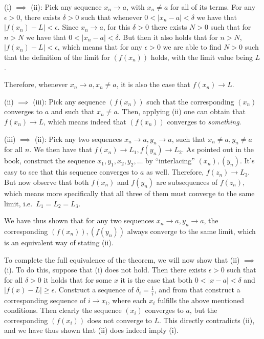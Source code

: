 \begin{solution}

    (i) $\implies$ (ii): Pick any sequence $x_n \rightarrow a$, with $x_n \neq a$ for all of its terms. For any $\epsilon > 0$, there exists $\delta > 0$ such that whenever $0 < \lvert x_n - a \rvert < \delta$ we have that $\lvert f(x_n) - L \rvert < \epsilon$. Since $x_n \rightarrow a$, for this $\delta > 0$ there exists $N > 0$ such that for $n > N$ we have that $0 < \lvert x_n - a \rvert < \delta$. But then it also holds that for $n > N$, $\lvert f(x_n) - L \rvert < \epsilon$, which means that for any $\epsilon > 0$ we are able to find $N > 0$ such that the definition of the limit for $(f(x_n))$ holds, with the limit value being $L$. 

    Therefore, whenever $x_n \rightarrow a, x_n \neq a$, it is also the case that $f(x_n) \rightarrow L$.

    (ii) $\implies$ (iii): Pick any sequence $(f(x_n))$ such that the corresponding $(x_n)$ converges to $a$ and such that $x_n \neq a$. Then, applying (ii) one can obtain that $f(x_n) \rightarrow L$, which means indeed that $(f(x_n))$ converges to \textit{something}.

    (iii) $\implies$ (ii): Pick any two sequences $x_n \rightarrow a, y_n \rightarrow a$, such that $x_n \neq a, y_n \neq a$ for all $n$. We then have that $f(x_n) \rightarrow L_1, f(y_n) \rightarrow L_2$. As pointed out in the book, construct the sequence $x_1, y_1, x_2, y_2, \ldots$ by ``interlacing'' $(x_n), (y_n)$. It's easy to see that this sequence converges to $a$ as well. Therefore, $f(z_n) \rightarrow L_3$. But now observe that both $f(x_n)$ and $f(y_n)$ are subsequences of $f(z_n)$, which means more specifically that all three of them must converge to the same limit, i.e.\ $L_1 = L_2 = L_3$.

    We have thus shown that for any two sequences $x_n \rightarrow a, y_n \rightarrow a$, the corresponding $(f(x_n)), (f(y_n))$ always converge to the same limit, which is an equivalent way of stating (ii).

    To complete the full equivalence of the theorem, we will now show that (ii) $\implies$ (i). To do this, suppose that (i) does not hold. Then there exists $\epsilon > 0$ such that for all $\delta > 0$ it holds that for some $x$ it is the case that both $0 < \lvert x - a \rvert < \delta$ and $\lvert f(x) - L \rvert \geq \epsilon$. Construct a sequence of $\delta_i = \frac{1}{i}$, and from that construct a corresponding sequence of $i \rightarrow x_i$, where each $x_i$ fulfills the above mentioned conditions. Then clearly the sequence $(x_i)$ converges to $a$, but the corresponding $(f(x_i))$ does not converge to $L$. This directly contradicts (ii), and we have thus shown that (ii) does indeed imply (i).
\end{solution}

